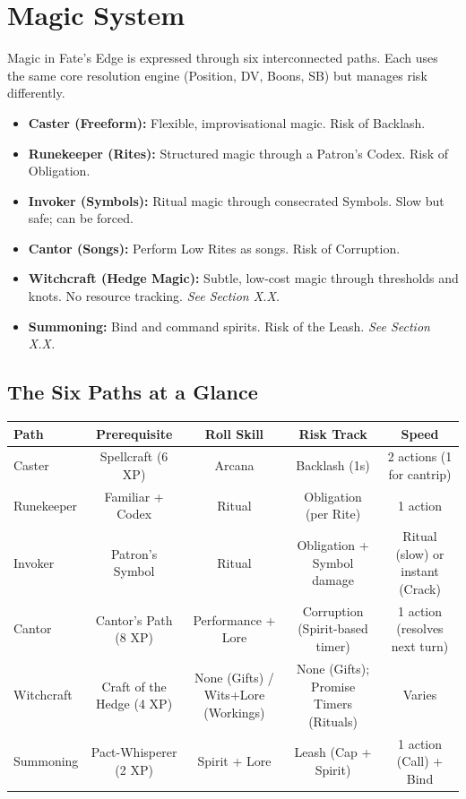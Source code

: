 \section{Magic System}

Magic in Fate's Edge is expressed through six interconnected paths. Each uses the same core resolution engine (Position, DV, Boons, SB) but manages risk differently.

\begin{itemize}
  \item \textbf{Caster (Freeform):} Flexible, improvisational magic. Risk of Backlash.
  \item \textbf{Runekeeper (Rites):} Structured magic through a Patron's Codex. Risk of Obligation.
  \item \textbf{Invoker (Symbols):} Ritual magic through consecrated Symbols. Slow but safe; can be forced.
  \item \textbf{Cantor (Songs):} Perform Low Rites as songs. Risk of Corruption.
  \item \textbf{Witchcraft (Hedge Magic):} Subtle, low-cost magic through thresholds and knots. No resource tracking. \textit{See Section X.X.}
  \item \textbf{Summoning:} Bind and command spirits. Risk of the Leash. \textit{See Section X.X.}
\end{itemize}

\subsection{The Six Paths at a Glance}

\begin{tabular}{@{}lcccc@{}}
\toprule
\textbf{Path} & \textbf{Prerequisite} & \textbf{Roll Skill} & \textbf{Risk Track} & \textbf{Speed} \\
\midrule
Caster & Spellcraft (6 XP) & Arcana & Backlash (1s) & 2 actions (1 for cantrip) \\
Runekeeper & Familiar + Codex & Ritual & Obligation (per Rite) & 1 action \\
Invoker & Patron's Symbol & Ritual & Obligation + Symbol damage & Ritual (slow) or instant (Crack) \\
Cantor & Cantor's Path (8 XP) & Performance + Lore & Corruption (Spirit-based timer) & 1 action (resolves next turn) \\
Witchcraft & Craft of the Hedge (4 XP) & None (Gifts) / Wits+Lore (Workings) & None (Gifts); Promise Timers (Rituals) & Varies \\
Summoning & Pact-Whisperer (2 XP) & Spirit + Lore & Leash (Cap + Spirit) & 1 action (Call) + Bind \\
\bottomrule
\end{tabular}

